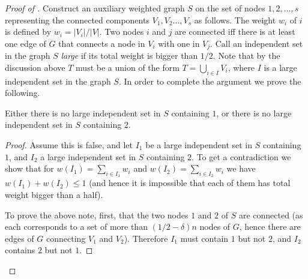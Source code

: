 \documentclass{toc}
\begin{document}
\begin{proof}[Proof of ]
Construct an auxiliary weighted graph $S$ on the set of nodes 
$1,2,
\ldots ,s$ representing the connected components  $V_1, V_2
\ldots ,V_s$ as follows. The weight $w_i$ of $i$ is defined
by $w_i= {|V_i|}/{|V|}$. Two nodes $i$ and $j$ are
connected iff there is at least one edge  of $G$ that connects a
node in $V_i$  with one in $V_j$. Call an independent set in
the graph $S$ \emph{large} if its total weight is bigger than $1/2$. Note
that by the discussion above $T$ must be a union of the form
%
$T=\bigcup_{i \in I} V_i$,  %
where $I$ is a large independent set in the
graph $S$. In order to complete the argument we prove the following.
\begin{claim}
\label{c24}
Either there is no 
large independent set  in $S$ containing $1$, or there is no
large independent set in $S$ containing $2$.
\end{claim}

\begin{proof}
  Assume this is false, and let $I_1$ be a large independent set in
  $S$ containing $1$, and $I_2$ a large independent set in $S$
  containing $2$. To get a contradiction we show that for
  $ w(I_1)=\sum_{i \in I_1}w_i$ and $w(I_2) =\sum_{i \in I_2} w_i$ we
  have $w(I_1) + w(I_2) \leq 1$ (and hence it is impossible that each
  of them has total weight bigger than a half).

  To prove the above note, first, that the two nodes $1$ and $2$ of
  $S$ are connected (as each corresponds to a set of more than
  $(1/2-\delta)n$ nodes of $G$, hence there are edges of $G$
  connecting $V_1$ and $V_2$). Therefore $I_1$ must contain $1$ but
  not $2$, and $I_2$ contains $2$ but not $1$.


\end{proof}
\end{proof}
\end{document}
